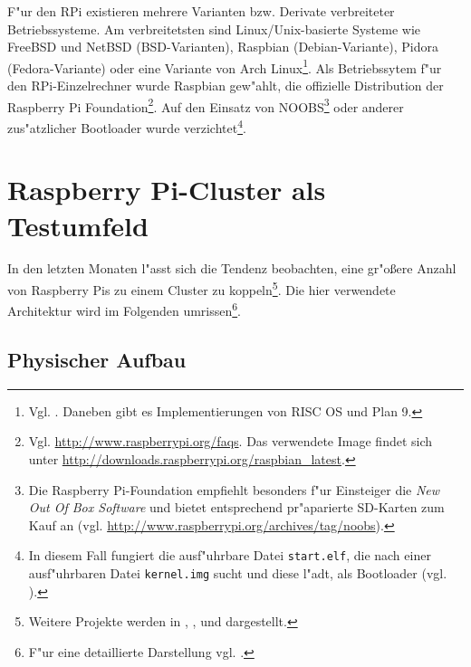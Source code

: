 F"ur den RPi existieren mehrere Varianten bzw. Derivate verbreiteter Betriebssysteme. Am verbreitetsten sind Linux/Unix-basierte Systeme wie FreeBSD und NetBSD (BSD-Varianten), Raspbian (Debian-Variante), Pidora (Fedora-Variante) oder eine Variante von Arch Linux\footnote{Vgl. \cite{pow12}. Daneben gibt es Implementierungen von RISC OS und Plan 9.}. Als Betriebssytem f"ur den RPi-Einzelrechner wurde Raspbian gew"ahlt, die offizielle Distribution der Raspberry Pi Foundation\footnote{Vgl. \url{http://www.raspberrypi.org/faqs}. Das verwendete Image findet sich unter \url{http://downloads.raspberrypi.org/raspbian_latest}.}. Auf den Einsatz von NOOBS\footnote{Die Raspberry Pi-Foundation empfiehlt besonders f"ur Einsteiger die \textit{New Out Of Box Software} und bietet entsprechend pr"aparierte SD-Karten zum Kauf an (vgl. \url{http://www.raspberrypi.org/archives/tag/noobs}).} oder anderer zus"atzlicher Bootloader wurde verzichtet\footnote{In diesem Fall fungiert die ausf"uhrbare Datei \texttt{start.elf}, die nach einer ausf"uhrbaren Datei \texttt{kernel.img} sucht und diese l"adt, als Bootloader (vgl. \cite{kli13}).}.

\section{Raspberry Pi-Cluster als Testumfeld}\label{Bramble-Spezi}

In den letzten Monaten l"asst sich die Tendenz beobachten, eine gr"o\ss ere Anzahl von Raspberry Pis zu einem Cluster zu koppeln\footnote{Weitere Projekte werden in \cite{cox13}, \cite{kie01}, \cite{bal12} und \cite{ou13} dargestellt.}. Die hier verwendete Architektur wird im Folgenden umrissen\footnote{F"ur eine detaillierte Darstellung vgl. \cite{kli13}.}. 

\subsection{Physischer Aufbau}\label{Bramble-Hardware}

